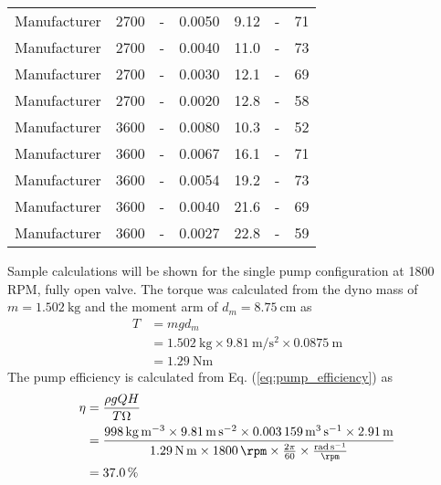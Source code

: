 \begin{longtable}{lC{0.10\textwidth}C{0.10\textwidth}C{0.10\textwidth}C{0.10\textwidth}C{0.10\textwidth}C{0.10\textwidth}}
    Manufacturer & 2700 & - & 0.0050 & 9.12 & - & 71 \\
    Manufacturer & 2700 & - & 0.0040 & 11.0 & - & 73 \\
    Manufacturer & 2700 & - & 0.0030 & 12.1 & - & 69 \\
    Manufacturer & 2700 & - & 0.0020 & 12.8 & - & 58 \\
    Manufacturer & 3600 & - & 0.0080 & 10.3 & - & 52 \\
    Manufacturer & 3600 & - & 0.0067 & 16.1 & - & 71 \\
    Manufacturer & 3600 & - & 0.0054 & 19.2 & - & 73 \\
    Manufacturer & 3600 & - & 0.0040 & 21.6 & - & 69 \\
    Manufacturer & 3600 & - & 0.0027 & 22.8 & - & 59 \\
    \bottomrule
\end{longtable}
\noindent Sample calculations will be shown for the single pump configuration at 1800 RPM, fully open valve. The torque was calculated from the dyno mass of $m = \qty{1.502}{\kilo\gram}$ and the moment arm of $d_m = \qty{8.75}{\centi\meter}$ as
\begin{align*}
    T &= m g d_m \\
    &= \qty{1.502}{\kilo\gram} \times \qty{9.81}{\meter\per\second\squared} \times \qty{0.0875}{\meter} \\
    &= \qty{1.29}{\newton\meter}
\end{align*}
The pump efficiency is calculated from Eq. (\ref{eq:pump_efficiency}) as
\begin{align*}
    \eta &= \frac{\rho g Q H}{T \Omega} \\
    &= \frac{\qty{998}{\kilo\gram\per\meter\cubed} \times \qty{9.81}{\meter\per\second\squared} \times \qty{0.003159}{\meter\cubed\per\second} \times \qty{2.91}{\meter}}{\qty{1.29}{\newton\meter} \times \qty{1800}{\rpm}\times \frac{2\pi}{60} \times \frac{\unit{\radian\per\second}}{\unit{\rpm}}} \\
    &= \qty{37.0}{\percent}
\end{align*}

